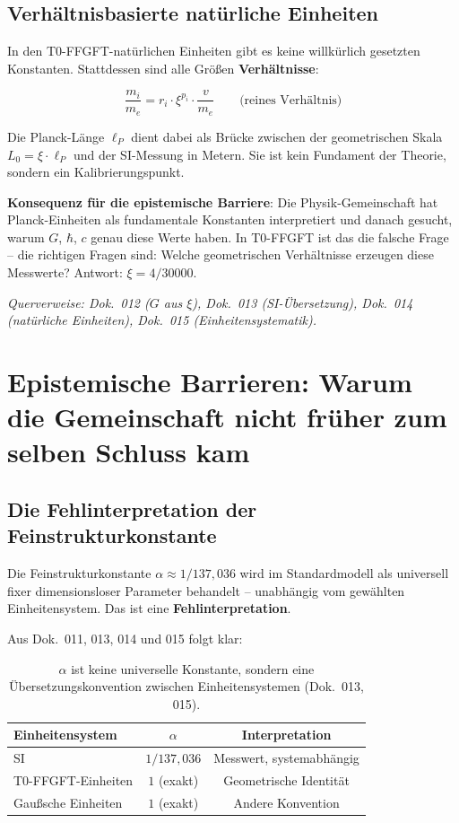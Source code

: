 \subsection{Verhältnisbasierte natürliche Einheiten}

In den T0-FFGFT-natürlichen Einheiten gibt es keine willkürlich
gesetzten Konstanten. Stattdessen sind alle Größen
\textbf{Verhältnisse}:

\begin{equation}
    \frac{m_i}{m_e} = r_i \cdot \xi^{p_i} \cdot \frac{v}{m_e}
    \qquad \text{(reines Verhältnis)}
\end{equation}

Die Planck-Länge $\ell_P$ dient dabei als Brücke zwischen der
geometrischen Skala $L_0 = \xi \cdot \ell_P$ und der SI-Messung
in Metern. Sie ist kein Fundament der Theorie, sondern ein
Kalibrierungspunkt.

\textbf{Konsequenz für die epistemische Barriere}:
Die Physik-Gemeinschaft hat Planck-Einheiten als fundamentale
Konstanten interpretiert und danach gesucht, warum $G$, $\hbar$,
$c$ genau diese Werte haben. In T0-FFGFT ist das die falsche Frage --
die richtigen Fragen sind: Welche geometrischen Verhältnisse
erzeugen diese Messwerte? Antwort: $\xi = 4/30000$.

\noindent\textit{Querverweise: Dok.~012 ($G$ aus $\xi$),
Dok.~013 (SI-Übersetzung), Dok.~014 (natürliche Einheiten),
Dok.~015 (Einheitensystematik).}

\section{Epistemische Barrieren: Warum die Gemeinschaft nicht früher zum selben Schluss kam}

\subsection{Die Fehlinterpretation der Feinstrukturkonstante}

Die Feinstrukturkonstante $\alpha \approx 1/137{,}036$ wird im
Standardmodell als universell fixer dimensionsloser Parameter
behandelt -- unabhängig vom gewählten Einheitensystem. Das ist
eine \textbf{Fehlinterpretation}.

Aus Dok.~011, 013, 014 und 015 folgt klar:

\begin{table}[htbp]
\centering
\begin{tabular}{lcc}
\toprule
\textbf{Einheitensystem} & $\alpha$ & \textbf{Interpretation} \\
\midrule
SI                        & $1/137{,}036$ & Messwert, systemabhängig \\
T0-FFGFT-Einheiten   & $1$ (exakt)   & Geometrische Identität \\
Gaußsche Einheiten        & $1$ (exakt)   & Andere Konvention \\
\bottomrule
\end{tabular}
\caption{$\alpha$ ist keine universelle Konstante, sondern eine
Übersetzungskonvention zwischen Einheitensystemen (Dok.~013, 015).}
\label{tab:alpha_einheiten}
\end{table}

